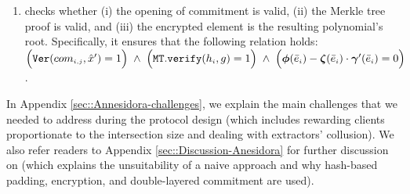\begin{enumerate}[leftmargin=4mm]
\begin{enumerate}
 \item\label{e-psi::SC-verification--check-three-vals} checks whether (i) the opening of commitment is valid,  (ii) the Merkle tree proof is valid, and (iii) the encrypted element is the resulting polynomial's root. Specifically, it ensures that the following relation holds: $\Big(\mathtt{Ver}(com_{\scriptscriptstyle i,j}, \hat{x}')=1\Big) \hspace{1mm} \wedge \hspace{1mm} \Big(\mathtt{MT.verify}(h_{\scriptscriptstyle i},g)=1\Big) \hspace{1mm} \wedge \hspace{1mm}  \Big(\bm\phi( \bar{e}_{\scriptscriptstyle i})-\bm\zeta( \bar{e}_{\scriptscriptstyle i})\cdot \bm\gamma'( \bar{e}_{\scriptscriptstyle i})=0\Big)$.




\end{enumerate}




\end{enumerate}

In Appendix \ref{sec::Annesidora-challenges}, we explain the main challenges that we needed to address during the protocol design (which includes rewarding clients proportionate to the intersection size and dealing with extractors’ collusion). We also refer readers to Appendix \ref{sec::Discussion-Anesidora} for further discussion on \withRew (which explains the unsuitability of a  naive approach and why hash-based padding, encryption, and double-layered commitment are used). 


